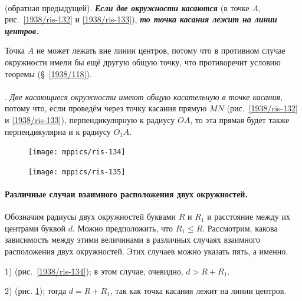 \documentclass[oneside]{book}
\begin{document}
\paragraph{}\label{1938/120}
 (обратная предыдущей).
\textbf{\emph{Если две окружности касаются}} (в точке $A$, рис.~\ref{1938/ris-132} и \ref{1938/ris-133}), \textbf{\emph{то точка касания лежит на линии центров.}}

Точка $A$ не может лежать вне линии центров, потому что в противном случае окружности имели бы ещё другую общую точку, что противоречит условию теоремы (§~\ref{1938/118}).

\paragraph{}\label{1938/121}
.
\emph{Две касающиеся окружности имеют общую касательную в точке касания}, потому что, если проведём через точку касания прямую $MN$ (рис.~\ref{1938/ris-132} и \ref{1938/ris-133}), перпендикулярную к радиусу $OA$, то эта прямая будет также перпендикулярна и к радиусу $O_1A$.

\begin{figure}[h!]
\begin{minipage}{.58\textwidth}
\centering
\texttt{[image: mppics/ris-134]}
\caption{}\label{1938/ris-134}
\end{minipage}
\hfill
\begin{minipage}{.38\textwidth}
\centering
\texttt{[image: mppics/ris-135]}
\caption{}\label{1938/ris-135}
\end{minipage}
\end{figure}

\paragraph{Различные случаи взаимного расположения двух окружностей.}\label{1938/122}
Обозначим радиусы двух окружностей буквами $R$ и $R_1$ и расстояние между их центрами буквой $d$.
Можно предположить, что $R_1\le R$.
Рассмотрим, какова зависимость между этими величинами в различных случаях взаимного расположения двух окружностей.
Этих случаев можно указать пять, а именно.

1)  (рис.~\ref{1938/ris-134});
в этом случае, очевидно, $d>R+R_1$.

2)  (рис. \ref{1938/ris-135});
тогда $d=R+R_1$, так как точка касания лежит на линии центров.
\end{document}
